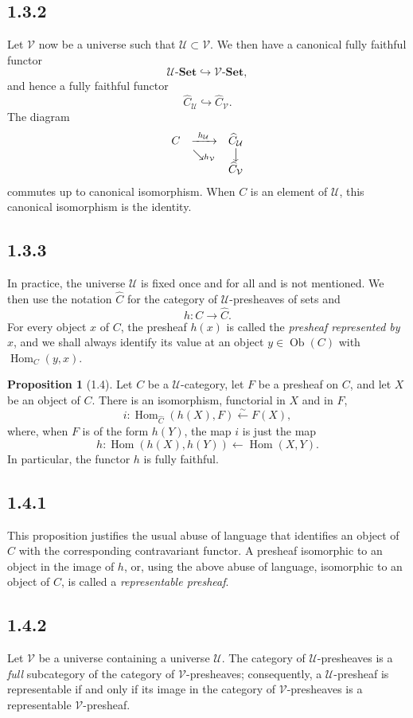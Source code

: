 \documentclass[11pt]{article}
\newcommand{\U}{\mathcal{U}}
\newcommand{\V}{\mathcal{V}}
\newcommand{\Ens}{\mathbf{Set}}
\newcommand{\Ob}{\operatorname{Ob}}
\newcommand{\Hom}{\operatorname{Hom}}
\theoremstyle{definition}
\newtheorem*{propositionstar}{Proposition}
\begin{document}
\subsection*{1.3.2}

Let $\V$ now be a universe such that $\U\subset \V$. We then have a canonical fully faithful functor
\[
\U\text{-}\Ens\hookrightarrow \V\text{-}\Ens,
\]
and hence a fully faithful functor
\[
\widehat{C}_{\U}\hookrightarrow \widehat{C}_{\V}.
\]
The diagram
\[
\begin{array}{ccc}
C & \xrightarrow{\ h_{\U}\ } & \widehat{C}_{\U}\\
 & \searrow_{h_{\V}} & \big\downarrow\\
 & & \widehat{C}_{\V}
\end{array}
\]
commutes up to canonical isomorphism. When $C$ is an element of $\U$, this canonical isomorphism is the identity.

\subsection*{1.3.3}

In practice, the universe $\U$ is fixed once and for all and is not mentioned. We then use the notation $\widehat{C}$ for the category of $\U$-presheaves of sets and
\[
h:C\longrightarrow \widehat{C}.
\]
For every object $x$ of $C$, the presheaf $h(x)$ is called the \emph{presheaf represented by} $x$, and we shall always identify its value at an object $y\in\Ob(C)$ with $\Hom_C(y,x)$.

\begin{propositionstar}[1.4]
Let $C$ be a $\U$-category, let $F$ be a presheaf on $C$, and let $X$ be an object of $C$. There is an isomorphism, functorial in $X$ and in $F$,
\[
i:\Hom_{\widehat{C}}(h(X),F)\xleftarrow{\sim} F(X),
\]
where, when $F$ is of the form $h(Y)$, the map $i$ is just the map
\[
h:\Hom(h(X),h(Y))\longleftarrow \Hom(X,Y).
\]
In particular, the functor $h$ is fully faithful.
\end{propositionstar}

\subsection*{1.4.1}

This proposition justifies the usual abuse of language that identifies an object of $C$ with the corresponding contravariant functor. A presheaf isomorphic to an object in the image of $h$, or, using the above abuse of language, isomorphic to an object of $C$, is called a \emph{representable presheaf}.

\subsection*{1.4.2}

Let $\V$ be a universe containing a universe $\U$. The category of $\U$-presheaves is a \emph{full} subcategory of the category of $\V$-presheaves; consequently, a $\U$-presheaf is representable if and only if its image in the category of $\V$-presheaves is a representable $\V$-presheaf.

\bigskip
\end{document}
